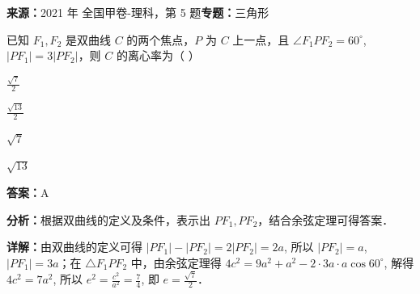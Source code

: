 \begin{question}[points=5]
\textbf{来源：}2021 年 全国甲卷-理科，第 5 题\quad \textbf{专题：}三角形\par
已知 $F_1, F_2$ 是双曲线 $C$ 的两个焦点，$P$ 为 $C$ 上一点，且 $\angle F_1PF_2 = 60^\circ$, $|PF_1| = 3|PF_2|$，则 $C$ 的离心率为（ ）
\begin{choices}
  \item $\frac{\sqrt{7}}{2}$
  \item $\frac{\sqrt{13}}{2}$
  \item $\sqrt{7}$
  \item $\sqrt{13}$
\end{choices}
\begin{solution}
\textbf{答案：}A

\textbf{分析：}根据双曲线的定义及条件，表示出 $PF_1, PF_2$，结合余弦定理可得答案．

\textbf{详解：}由双曲线的定义可得 $|PF_1|-|PF_2| = 2|PF_2| = 2a$, 所以 $|PF_2| = a$, $|PF_1| = 3a$；在 $\triangle F_1PF_2$ 中，由余弦定理得 $4c^2 = 9a^2 + a^2 - 2\cdot 3a\cdot a\cos60^\circ$, 解得 $4c^2 = 7a^2$, 所以 $e^2 = \frac{c^2}{a^2} = \frac{7}{4}$, 即 $e = \frac{\sqrt{7}}{2}$．
\end{solution}
\end{question}

